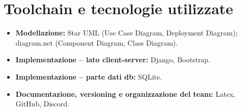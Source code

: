 \newpage
\section{Toolchain e tecnologie utilizzate}
\begin{itemize}
      \item \textbf{Modellazione:} Star UML  (Use Case Diagram, Deployment Diagram); diagram.net (Component Diagram, Class Diagram). 
      \item \textbf{Implementazione -- lato client-server:} Django, Bootstrap.
      \item \textbf{Implementazione -- parte dati db:} SQLite.
      \item \textbf{Documentazione, versioning e organizzazione del team:} Latex, GitHub, Discord.
\end{itemize}
